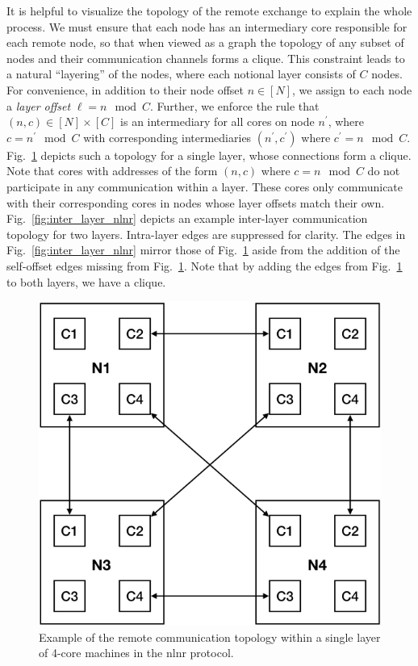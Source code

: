 \documentclass{report}
\begin{document}
It is helpful to visualize the topology of the remote exchange to explain the whole process. 
We must ensure that each node has an intermediary core responsible for each remote node, so that when viewed as a graph the topology of any subset of nodes and their communication channels forms a clique. 
This constraint leads to a natural ``layering'' of the nodes, where each notional layer consists of $C$ nodes. 
For convenience, in addition to their node offset $n \in [N]$, we assign to each node a \emph{layer offset} $\ell = n \mod C$.
Further, we enforce the rule that $(n,c) \in [N] \times [C]$ is an intermediary for all cores on node $n^\prime$, where $c = n^\prime \mod C$ with corresponding intermediaries $(n^\prime, c^\prime)$ where $c^\prime = n \mod C$. 
Fig.~\ref{fig:intra_layer_nlnr} depicts such a topology for a single layer, whose connections form a clique. 
Note that cores with addresses of the form $(n, c)$ where $c = n \mod C$ do not participate in any communication within a layer. 
These cores only communicate with their corresponding cores in nodes whose layer offsets match their own. 
Fig.~\ref{fig:inter_layer_nlnr} depicts an example inter-layer communication topology  for two layers. 
Intra-layer edges are suppressed for clarity. 
The edges in Fig.~\ref{fig:inter_layer_nlnr} mirror those of Fig.~\ref{fig:intra_layer_nlnr} aside from the addition of the self-offset edges missing from Fig.~\ref{fig:intra_layer_nlnr}.
Note that by adding the edges from Fig.~\ref{fig:intra_layer_nlnr} to both layers, we have a clique.


\begin{figure}[htbp] 
\centerline{\includegraphics[width=0.6\columnwidth]{intra_layer_nlnr}}
\caption{Example of the remote communication topology within a single layer of 4-core machines in the nlnr protocol.
\label{fig:intra_layer_nlnr}}
\end{figure}
\end{document}
